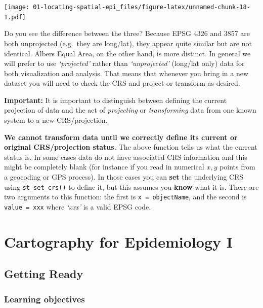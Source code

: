 \documentclass[
]{book}
\newenvironment{rmdnote}[1]
  {
  \begin{itemize}
  \renewcommand{\labelitemi}{
    \raisebox{-.7\height}[0pt][0pt]{
      {\setkeys{Gin}{width=3em,keepaspectratio}\texttt{[image: images/\#1]}}
    }
  }
  \setlength{\fboxsep}{1em}
  \begin{note}
  \item
  }
  {
  \end{note}
  \end{itemize}
  }
\begin{document}
\texttt{[image: 01-locating-spatial-epi\_files/figure-latex/unnamed-chunk-18-1.pdf]}

Do you see the difference between the three? Because EPSG 4326 and 3857 are both unprojected (e.g.~they are long/lat), they appear quite similar but are not identical. Albers Equal Area, on the other hand, is more distinct. In general we will prefer to use \emph{`projected'} rather than \emph{`unprojected'} (long/lat only) data for both visualization and analysis. That means that whenever you bring in a new dataset you will need to check the CRS and project or transform as desired.

\begin{rmdnote}{note}
\textbf{Important:} It is important to distinguish between defining the current projection of data and the act of \emph{projecting} or \emph{transforming} data from one known system to a new CRS/projection.

\textbf{We cannot transform data until we correctly define its current or original CRS/projection status.} The above function tells us what the current status is. In some cases data do not have associated CRS information and this might be completely blank (for instance if you read in numerical \(x,y\) points from a geocoding or GPS process). In those cases you can \textbf{set} the underlying CRS using \texttt{st\_set\_crs()} to define it, but this assumes you \textbf{know} what it is. There are two arguments to this function: the first is \texttt{x\ =\ objectName}, and the second is \texttt{value\ =\ xxx} where \emph{`xxx'} is a valid EPSG code.

\end{rmdnote}

\hypertarget{cartography-for-epidemiology-i}{%
\chapter{Cartography for Epidemiology I}\label{cartography-for-epidemiology-i}}

\hypertarget{getting-ready-1}{%
\section{Getting Ready}\label{getting-ready-1}}

\hypertarget{learning-objectives-1}{%
\subsection{Learning objectives}\label{learning-objectives-1}}
\end{document}
